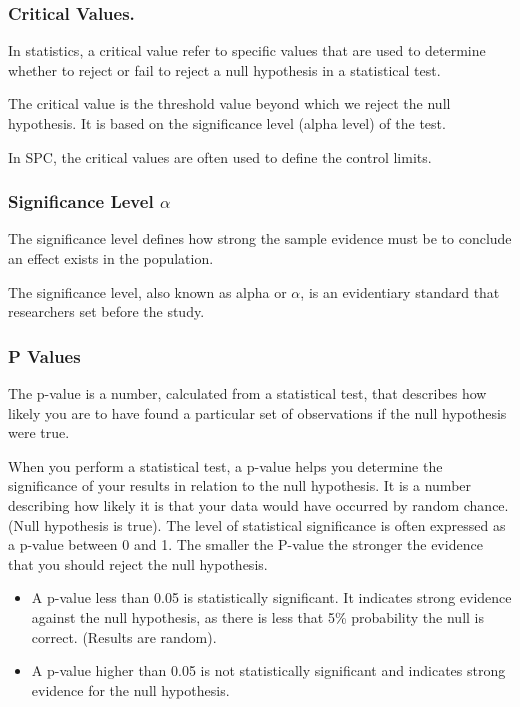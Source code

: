 \documentclass[11pt]{article}
\begin{document}
\hypertarget{critical-values.}{%
\subsubsection{Critical Values.}\label{critical-values.}}

In statistics, a critical value refer to specific values that are used
to determine whether to reject or fail to reject a null hypothesis in a
statistical test.

The critical value is the threshold value beyond which we reject the
null hypothesis. It is based on the significance level (alpha level) of
the test.

In SPC, the critical values are often used to define the control limits.

\hypertarget{significance-level-alpha}{%
\subsubsection{\texorpdfstring{Significance Level
\(\alpha\)}{Significance Level \textbackslash alpha}}\label{significance-level-alpha}}

The significance level defines how strong the sample evidence must be to
conclude an effect exists in the population.

The significance level, also known as alpha or \(\alpha\), is an
evidentiary standard that researchers set before the study.

\hypertarget{p-values}{%
\subsubsection{P Values}\label{p-values}}

The p-value is a number, calculated from a statistical test, that describes how
likely you are to have found a particular set of observations if the null hypothesis were true.


When you perform a statistical test, a p-value helps you determine the
significance of your results in relation to the null hypothesis. It is a
number describing how likely it is that your data would have occurred by
random chance. (Null hypothesis is true). The level of statistical
significance is often expressed as a p-value between 0 and 1. The
smaller the P-value the stronger the evidence that you should reject the
null hypothesis.

\begin{itemize}
\item
  A p-value less than 0.05 is statistically significant. It indicates
  strong evidence against the null hypothesis, as there is less that 5\%
  probability the null is correct. (Results are random).
\item
  A p-value higher than 0.05 is not statistically significant and
  indicates strong evidence for the null hypothesis.
\end{itemize}
\end{document}

